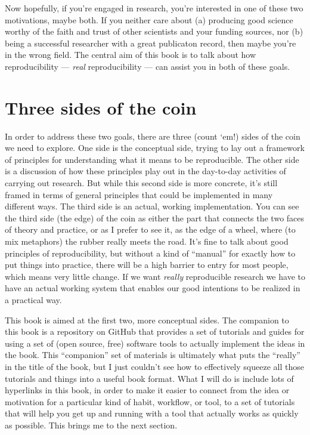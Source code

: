 \documentclass{book}
\begin{document}
Now hopefully, if you're engaged in research, you're interested in one of these two motivations, maybe both. If you neither care about (a) producing good science worthy of the faith and trust of other scientists and your funding sources, nor (b) being a successful researcher with a great publicaton record, then maybe you're in the wrong field.  The central aim of this book is to talk about how reproducibility --- \emph{real} reproducibility --- can assist you in both of these goals.
\section{Three sides of the coin}
\label{sec-1-2}

In order to address these two goals, there are three (count `em!) sides of the coin we need to explore.  One side is the conceptual side, trying to lay out a framework of principles for understanding what it means to be reproducible.  The other side is a discussion of how these principles play out in the day-to-day activities of carrying out research.  But while this second side is more concrete, it's still framed in terms of general principles that could be implemented in many different ways.  The third side is an actual, working implementation. You can see the third side (the edge) of the coin as either the part that connects the two faces of theory and practice, or as I prefer to see it, as the edge of a wheel, where (to mix metaphors) the rubber really meets the road.  It's fine to talk about good principles of reproducibility, but without a kind of ``manual'' for exactly how to put things into practice, there will be a high barrier to entry for most people, which means very little change. If we want \emph{really} reproducible research we have to have an actual working system that enables our good intentions to be realized in a practical way.

This book is aimed at the first two, more conceptual sides.  The companion to this book is a repository on GitHub that provides a set of tutorials and guides for using a set of (open source, free) software tools to actually implement the ideas in the book.  This ``companion'' set of materials is ultimately what puts the ``really'' in the title of the book, but I just couldn't see how to effectively squeeze all those tutorials and things into a useful book format.  What I will do is include lots of hyperlinks in this book, in order to make it easier to connect from the idea or motivation for a particular kind of habit, workflow, or tool, to a set of tutorials that will help you get up and running with a tool that actually works as quickly as possible.  This brings me to the next section.
\end{document}

